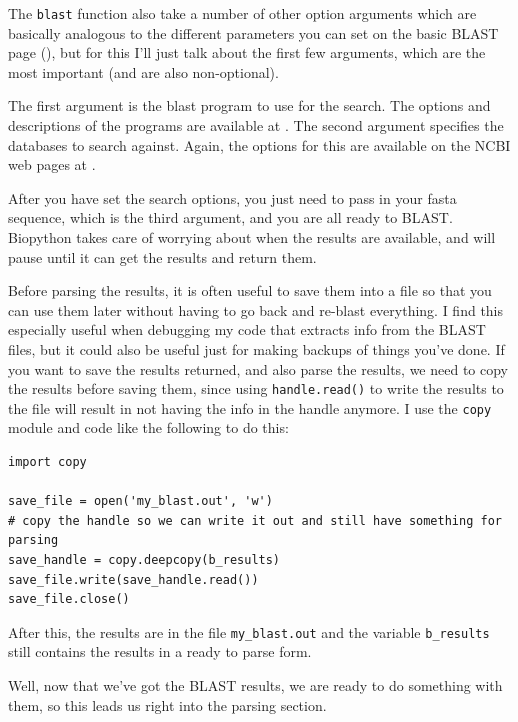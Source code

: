 \documentclass{report}
\begin{document}
The \verb|blast| function also take a number of other option arguments which are basically analogous to the different parameters you can set on the basic BLAST page (), but for this I'll just talk about the first few arguments, which are the most important (and are also non-optional).


The first argument is the blast program to use for the search. The options and descriptions of the programs are available at . The second argument specifies the databases to search against. Again, the options for this are available on the NCBI web pages at . 


After you have set the search options, you just need to pass in your fasta sequence, which is the third argument, and you are all ready to BLAST. Biopython takes care of worrying about when the results are available, and will pause until it can get the results and return them.


Before parsing the results, it is often useful to save them into a file so that you can use them later without having to go back and re-blast everything. I find this especially useful when debugging my code that extracts info from the BLAST files, but it could also be useful just for making backups of things you've done. If you want to save the results returned, and also parse the results, we need to copy the results before saving them, since using \verb|handle.read()| to write the results to the file will result in not having the info in the handle anymore. I use the \verb|copy| module and code like the following to do this:

\begin{verbatim}
import copy

save_file = open('my_blast.out', 'w')
# copy the handle so we can write it out and still have something for parsing
save_handle = copy.deepcopy(b_results)
save_file.write(save_handle.read())
save_file.close()
\end{verbatim}

After this, the results are in the file \verb|my_blast.out| and the variable \verb|b_results| still contains the results in a ready to parse form.


Well, now that we've got the BLAST results, we are ready to do something with them, so this leads us right into the parsing section.
\end{document}
